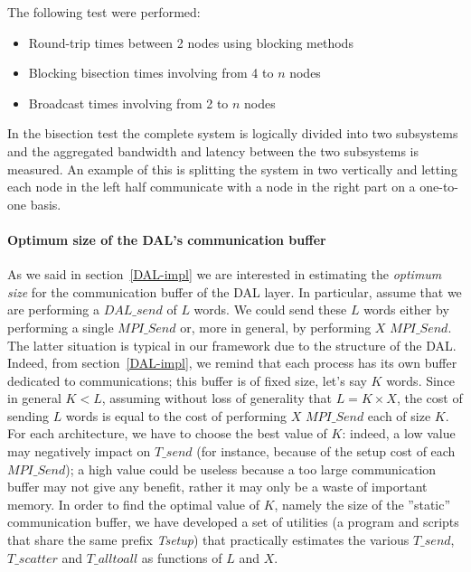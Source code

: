 The following test were performed:
\begin{itemize}
	\item Round-trip times between 2 nodes using blocking methods
	\item Blocking bisection times involving from 4 to $n$ nodes
	\item Broadcast times involving from 2 to $n$ nodes
\end{itemize}
In the bisection test the complete system is logically divided into two subsystems and the aggregated bandwidth and latency between the two subsystems is measured. An example of this is splitting the system in two vertically and letting each node in the left half communicate with a node in the right part on a one-to-one basis.

\paragraph{Optimum size of the DAL's communication buffer}
As we said in section~\ref{DAL-impl} we are interested in estimating the \textit{optimum size} for the communication buffer of the DAL layer. In particular, assume that we are performing a $DAL\_send$ of $L$ words. We could send these $L$ words either by performing a single $MPI\_Send$ or, more in general, by performing $X$ $MPI\_Send$. The latter situation is typical in our framework due to the structure of the DAL. Indeed, from section~\ref{DAL-impl}, we remind that each process has its own buffer dedicated to communications; this buffer is of fixed size, let's say $K$ words. Since in general $K < L$, assuming without loss of generality that $L = K \times X$, the cost of sending $L$ words is equal to the cost of performing $X$ $MPI\_Send$ each of size $K$. For each architecture, we have to choose the best value of $K$: indeed, a low value may negatively impact on $T\_send$ (for instance, because of the setup cost of each $MPI\_Send$); a high value could be useless because a too large communication buffer may not give any benefit, rather it may only be a waste of important memory. In order to find the optimal value of $K$, namely the size of the ''static'' communication buffer, we have developed a set of utilities (a program and scripts that share the same prefix  \textit{Tsetup}) that practically estimates the various $T\_send$, $T\_scatter$ and $T\_alltoall$ as functions of $L$ and $X$. 

